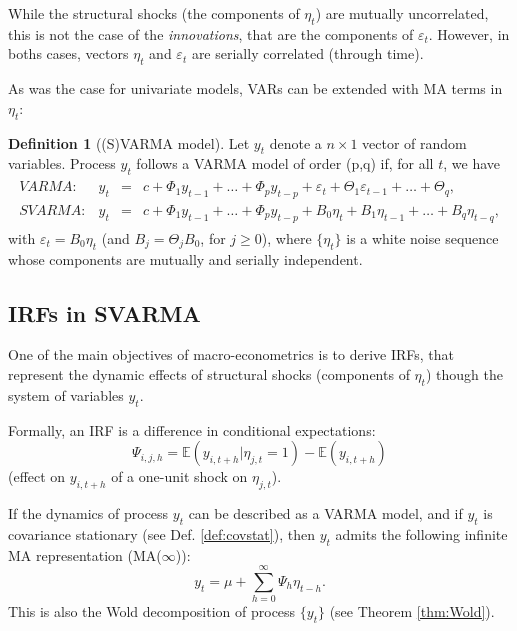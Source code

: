 \documentclass[
  12pt,
]{book}
\theoremstyle{definition}
\newtheorem{definition}{Definition}[chapter]
\theoremstyle{definition}
\theoremstyle{definition}
\theoremstyle{definition}
\theoremstyle{remark}
\begin{document}
While the structural shocks (the components of \(\eta_t\)) are mutually uncorrelated, this is not the case of the \emph{innovations}, that are the components of \(\varepsilon_t\). However, in boths cases, vectors \(\eta_t\) and \(\varepsilon_t\) are serially correlated (through time).

As was the case for univariate models, VARs can be extended with MA terms in \(\eta_t\):

\begin{definition}[(S)VARMA model]
\protect\hypertarget{def:SVARMA}{}\label{def:SVARMA}Let \(y_{t}\) denote a \(n \times1\) vector of random variables. Process \(y_{t}\) follows a VARMA model of order (p,q) if, for all \(t\), we have
\begin{eqnarray}
\begin{array}{rllll}
VARMA:& y_t &=& c + \Phi_1 y_{t-1} + \dots + \Phi_p y_{t-p} + \varepsilon_t + \Theta_1\varepsilon_{t-1} + \dots + \Theta_q ,\\
SVARMA:& y_t &=& c + \Phi_1 y_{t-1} + \dots + \Phi_p y_{t-p} + B_0 \eta_t+ B_1 \eta_{t-1} + \dots +  B_q \eta_{t-q},
\end{array}\label{eq:yVARMA}
\end{eqnarray}
with \(\varepsilon_t = B_0\eta_t\) (and \(B_j = \Theta_j B_0\), for \(j \ge 0\)), where \(\{\eta_{t}\}\) is a white noise sequence whose components are mutually and serially independent.
\end{definition}

\hypertarget{IRFSVARMA}{%
\subsection{IRFs in SVARMA}\label{IRFSVARMA}}

One of the main objectives of macro-econometrics is to derive IRFs, that represent the dynamic effects of structural shocks (components of \(\eta_t\)) though the system of variables \(y_t\).

Formally, an IRF is a difference in conditional expectations:
\[
\boxed{\Psi_{i,j,h} = \mathbb{E}(y_{i,t+h}|\eta_{j,t}=1) - \mathbb{E}(y_{i,t+h})}
\]
(effect on \(y_{i,t+h}\) of a one-unit shock on \(\eta_{j,t}\)).

If the dynamics of process \(y_t\) can be described as a VARMA model, and if \(y_t\) is covariance stationary (see Def. \ref{def:covstat}), then \(y_t\) admits the following infinite MA representation (MA(\(\infty\))):
\begin{equation}
y_t = \mu + \sum_{h=0}^\infty \Psi_{h} \eta_{t-h}.\label{eq:InfMA}
\end{equation}
This is also the Wold decomposition of process \(\{y_t\}\) (see Theorem \ref{thm:Wold}).
\end{document}
